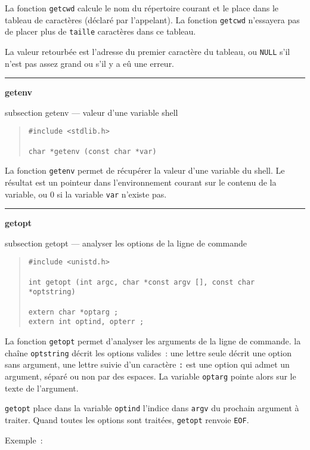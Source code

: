 \documentclass [twoside] {report}
\newcommand {\primitive} [1]
    {
	{\large \bf #1}
	\addcontentsline {toc} {subsection} {#1}
    }
\newcommand {\separation}
    {
	\vspace {7mm}
	\nopagebreak
	\hrule
    }
\begin{document}
La fonction {\tt getcwd} calcule le nom du répertoire courant et le
place dans le tableau de caractères (déclaré par l'appelant). La
fonction {\tt getcwd} n'essayera pas de placer plus de {\tt taille}
caractères dans ce tableau.

La valeur retourbée est l'adresse du premier caractère du tableau, ou
{\tt NULL} s'il n'est pas assez grand ou s'il y a eû une erreur.


\separation 
\primitive {getenv} --- valeur d'une variable shell

\begin {quote}
\begin {verbatim}
#include <stdlib.h>

char *getenv (const char *var)
\end{verbatim}
\end {quote}

La fonction {\tt getenv} permet de récupérer la valeur d'une
variable du shell. Le résultat est un pointeur
dans l'environnement courant sur le contenu de la variable,
ou 0 si la variable {\tt var}
n'existe pas.


\separation 
\primitive {getopt} --- analyser les options de la ligne de commande

\begin {quote}
\begin {verbatim}
#include <unistd.h>

int getopt (int argc, char *const argv [], const char *optstring)

extern char *optarg ;
extern int optind, opterr ;
\end{verbatim}
\end {quote}

La fonction {\tt getopt} permet d'analyser les arguments de
la ligne de commande. la chaîne {\tt optstring} décrit les
options valides~: une lettre seule décrit une option sans
argument, une lettre suivie d'un caractère {\tt :} est une
option qui admet un argument, séparé ou non par des espaces.
La variable {\tt optarg} pointe alors sur le texte de
l'argument.

{\tt getopt} place dans la variable {\tt optind} l'indice dans
{\tt argv} du prochain argument à traiter. Quand toutes les
options sont traitées, {\tt getopt} renvoie {\tt EOF}.

Exemple~:
\end{document}
